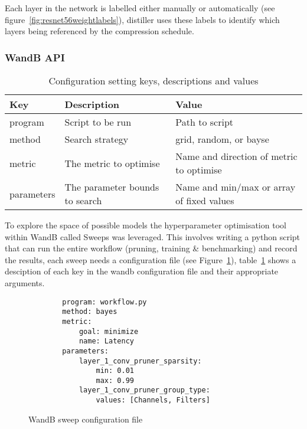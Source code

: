 \documentclass[../Dissertation.tex]{subfiles}
\begin{document}
Each layer in the network is labelled either manually or automatically (see figure~\ref{fig:resnet56weightlabels}), distiller uses these labels to identify which layers being referenced by the compression schedule. 



\subsubsection{WandB API}

\begin{table}[H]
    \begin{tabular}{@{}|l|l|l|@{}}
    \toprule
    Key        & Description                    & Value                                    \\ \midrule
    program    & Script to be run               & Path to script                           \\ \midrule
    method     & Search strategy                & grid, random, or bayse                   \\ \midrule
    metric     & The metric to optimise         & Name and direction of metric to optimise \\ \midrule
    parameters & The parameter bounds to search & Name and min/max or array of fixed values  \\ \bottomrule
    \end{tabular}
    \caption{Configuration setting keys, descriptions and values}
    \label{tab:WandBConfig}
\end{table}

To explore the space of possible models the hyperparameter optimisation tool within WandB called Sweeps was leveraged. 
This involves writing a python script that can run the entire workflow (pruning, training \& benchmarking) and record the results, each sweep needs a configuration file (see Figure~\ref{fig:sweepConfig}), table~\ref{tab:WandBConfig} shows a desciption of each key in the wandb configuration file and their appropriate arguments. 



\singlespacing
\begin{figure}[H]
    \begin{verbatim}
        program: workflow.py
        method: bayes
        metric:
            goal: minimize
            name: Latency
        parameters:
            layer_1_conv_pruner_sparsity:
                min: 0.01
                max: 0.99
            layer_1_conv_pruner_group_type:
                values: [Channels, Filters]
    \end{verbatim}
    \caption{WandB sweep configuration file}
    \label{fig:sweepConfig}
\end{figure}
\doublespacing
\end{document}
